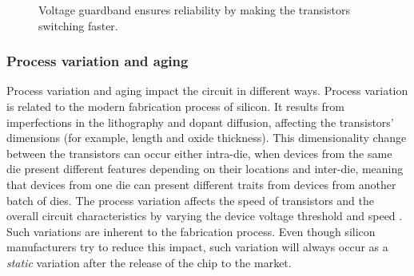 \begin{figure}[!htb]
    \centering
  \begin{subfigmatrix}{2}
  \end{subfigmatrix}
  \caption{Voltage guardband ensures reliability by making the transistors switching faster.}
\end{figure}




\subsubsection{Process variation and aging}

Process variation and aging impact the circuit in different ways. Process variation is related to the modern fabrication process of silicon. It results from imperfections in the lithography and dopant diffusion, affecting the transistors' dimensions (for example, length and oxide thickness). This dimensionality change between the transistors can occur either intra-die, when devices from the same die present different features depending on their locations and inter-die, meaning that devices from one die can present different traits from devices from another batch of dies. The process variation affects the speed of transistors and the overall circuit characteristics by varying the device voltage threshold and speed \cite{schemmert_threshold-voltage_1974, thomas_core_2016}. Such variations are inherent to the fabrication process. Even though silicon manufacturers try to reduce this impact, such variation will always occur as a \textit{static} variation after the release of the chip to the market.

